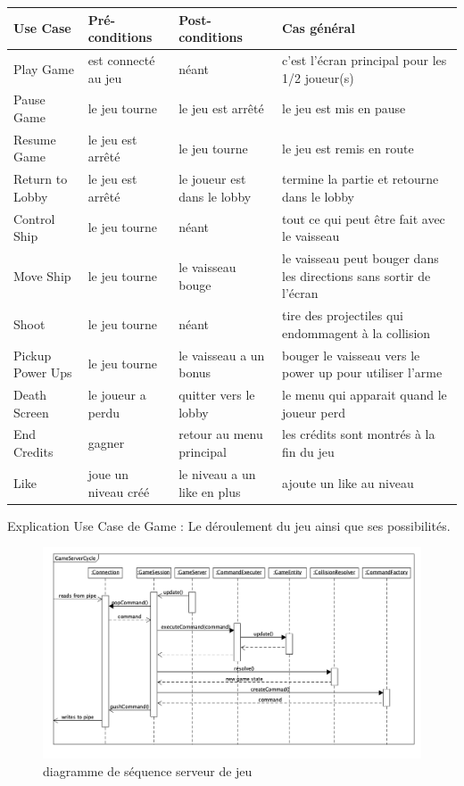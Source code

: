 \documentclass[french]{article}
\begin{document}
\begin{longtable}{|p{}|p{}|p{}|p{}|}
  \toprule
  \rowcolor{lightgray}
  \textbf{Use Case} & \textbf{Pré-conditions} & \textbf{Post-conditions}& \textbf{Cas général}\\
  \midrule
  Play Game & est connecté au jeu & néant & c'est l'écran principal pour les 1/2 joueur(s)\\
  \hline
  Pause Game & le jeu tourne & le jeu est arrêté & le jeu est mis en pause\\
  \hline
  Resume Game & le jeu est arrêté & le jeu tourne & le jeu est remis en route\\
  \hline
  Return to Lobby & le jeu est arrêté & le joueur est dans le lobby & termine la partie et retourne dans le lobby\\
  
  \hline
  Control Ship & le jeu tourne & néant & tout ce qui peut être fait avec le vaisseau\\
  \hline
  Move Ship & le jeu tourne & le vaisseau bouge & le vaisseau peut bouger dans les directions sans sortir de l'écran\\
  \hline
  Shoot & le jeu tourne & néant & tire des projectiles qui endommagent à la collision\\
  \hline
  Pickup Power Ups & le jeu tourne & le vaisseau a un bonus & bouger le vaisseau vers le power up pour utiliser l'arme\\
  \hline
  Death Screen & le joueur a perdu & quitter vers le lobby & le menu qui apparait quand le joueur perd\\
  \hline
  End Credits & gagner & retour au menu principal & les crédits sont montrés à la fin du jeu\\
  \hline
  Like & joue un niveau créé & le niveau a un like en plus & ajoute un like au niveau\\
  \bottomrule
\end{longtable}
\begin{center}
Explication Use Case de Game : Le déroulement du jeu ainsi que ses possibilités.
\end{center}
\begin{figure}[!htbp]
    \centering
    \includegraphics[scale=0.6, angle=90]{sequence_diagram/game_server_sequence.png}
    \caption{diagramme de séquence serveur de jeu}
    \label{sequence diagram:game server}
\end{figure}
\end{document}
